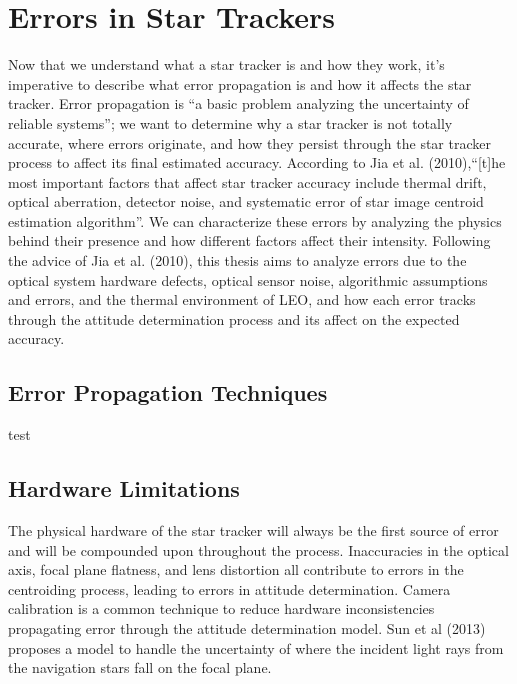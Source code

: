\section{Errors in Star Trackers}

\par \qquad Now that we understand what a star tracker is and how they work, it's imperative to describe what error propagation is and how it affects the star tracker.
Error propagation is ``a basic problem analyzing the uncertainty of reliable systems''\cite{ErrorPropagation}; we want to determine why a star tracker is not totally accurate, where errors originate, and how they persist through the star tracker process to affect its final estimated accuracy.
According to Jia et al. (2010),``[t]he most important factors that affect star tracker accuracy include thermal drift, optical aberration, detector noise, and systematic error of star image centroid estimation algorithm''\cite{systematic_error_analysis_of_star_tracker_centroiding}.
We can characterize these errors by analyzing the physics behind their presence and how different factors affect their intensity.
Following the advice of Jia et al. (2010), this thesis aims to analyze errors due to the optical system hardware defects, optical sensor noise, algorithmic assumptions and errors, and the thermal environment of LEO, and how each error tracks through the attitude determination process and its affect on the expected accuracy.

\subsection*{Error Propagation Techniques}
\par \qquad test

\subsection*{Hardware Limitations}
\par \qquad The physical hardware of the star tracker will always be the first source of error and will be compounded upon throughout the process. 
Inaccuracies in the optical axis, focal plane flatness, and lens distortion all contribute to errors in the centroiding process, leading to errors in attitude determination. 
Camera calibration is a common technique to reduce hardware inconsistencies propagating error through the attitude determination model. 
Sun et al (2013) proposes a model to handle the uncertainty of where the incident light rays from the navigation stars fall on the focal plane. \cite{optical_system_error_analysis_and_calibration}

